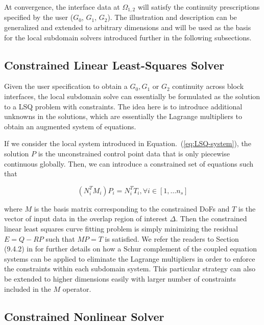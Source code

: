 \documentclass[conference]{IEEEtran}
\newcommand{\eqt}[1]{Equation.~(\ref{#1})}
\begin{document}
At convergence, the interface data at $\Omega_{1,2}$ will satisfy the continuity prescriptions specified by the user ($G_0$, $G_1$, $G_2$). The illustration and description can be generalized and extended to arbitrary dimensions and will be used as the basis for the local subdomain solvers introduced further in the following subsections.

\subsection{Constrained Linear Least-Squares Solver}

Given the user specification to obtain a $G_0, G_1$ or $G_2$ continuity across block interfaces, the local subdomain solve can essentially be formulated as the solution to a LSQ problem with constraints. The idea here is to introduce additional unknowns in the solutions, which are essentially the Lagrange multipliers to obtain an augmented system of equations.

If we consider the local system introduced in \eqt{eq:LSQ-system}, the solution $P$ is the unconstrained control point data that is only piecewise continuous globally. Then, we can introduce a constrained set of equations \cite{nurbs-book} such that 

\begin{equation}
(N_i^T M_i) P_i = N_i^T T_i, \forall i \in [1, \ldots n_s]
\label{eq:LSQ-system-constraint}
\end{equation}

where $M$ is the basis matrix corresponding to the constrained DoFs and $T$ is the vector of input data in the overlap region of interest $\Delta$. Then the constrained linear least squares curve fitting problem is simply minimizing the residual $E=Q-RP$ such that $MP=T$ is satisfied. We refer the readers to Section (9.4.2) in \cite{nurbs-book} for further details on how a Schur complement of the coupled equation systems can be applied to eliminate the Lagrange multipliers in order to enforce the constraints within each subdomain system. This particular strategy can also be extended to higher dimensions easily with larger number of constraints included in the $M$ operator.

\subsection{Constrained Nonlinear Solver}
\end{document}
